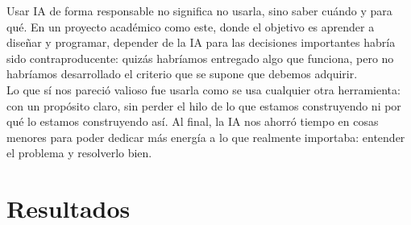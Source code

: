 \documentclass[man]{apa7}
\begin{document}
	Usar IA de forma responsable no significa no usarla, sino saber cuándo y para qué. En un proyecto académico como este, donde el objetivo es aprender a diseñar y programar, depender de la IA para las decisiones importantes habría sido contraproducente: quizás habríamos entregado algo que funciona, pero no habríamos desarrollado el criterio que se supone que debemos adquirir.\\
	Lo que sí nos pareció valioso fue usarla como se usa cualquier otra herramienta: con un propósito claro, sin perder el hilo de lo que estamos construyendo ni por qué lo estamos construyendo así. Al final, la IA nos ahorró tiempo en cosas menores para poder dedicar más energía a lo que realmente importaba: entender el problema y resolverlo bien.
	
	
	\newpage
	
	\section*{Resultados}\label{sec:Resultados}
	
	
	
	\newpage
	
\end{document}

